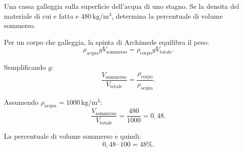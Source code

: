 
\begin{esercizio}
Una cassa galleggia sulla superficie dell'acqua di uno stagno. Se la densita
del materiale di cui e fatta e $480\,\mathrm{kg/m^3}$, determina la percentuale
di volume sommerso.
\end{esercizio}

\begin{soluzione}
Per un corpo che galleggia, la spinta di Archimede equilibra il peso:
\[
\rho_\text{acqua}gV_\text{sommerso}
=\rho_\text{corpo}gV_\text{totale}.
\]

Semplificando \(g\):
\[
\frac{V_\text{sommerso}}{V_\text{totale}}
=\frac{\rho_\text{corpo}}{\rho_\text{acqua}}.
\]

Assumendo \(\rho_\text{acqua}=1000\,\mathrm{kg/m^3}\):
\[
\frac{V_\text{sommerso}}{V_\text{totale}}
=\frac{480}{1000}=0{,}48.
\]

La percentuale di volume sommerso e quindi:
\[
0{,}48\cdot 100=48\%.
\]
\end{soluzione}
